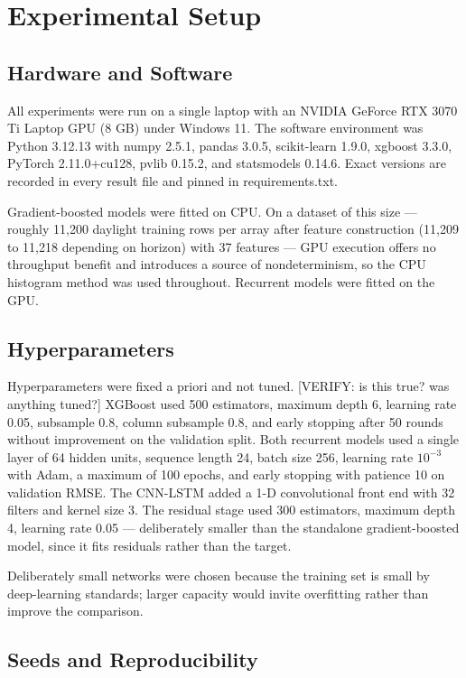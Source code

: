 \section{Experimental Setup}

\subsection{Hardware and Software}

All experiments were run on a single laptop with an NVIDIA GeForce RTX 3070 Ti Laptop GPU (8 GB) under Windows 11. The software environment was Python 3.12.13 with numpy 2.5.1, pandas 3.0.5, scikit-learn 1.9.0, xgboost 3.3.0, PyTorch 2.11.0+cu128, pvlib 0.15.2, and statsmodels 0.14.6. Exact versions are recorded in every result file and pinned in requirements.txt.

Gradient-boosted models were fitted on CPU. On a dataset of this size — roughly 11,200 daylight training rows per array after feature construction (11,209 to 11,218 depending on horizon) with 37 features — GPU execution offers no throughput benefit and introduces a source of nondeterminism, so the CPU histogram method was used throughout. Recurrent models were fitted on the GPU.

\subsection{Hyperparameters}

Hyperparameters were fixed a priori and not tuned. [VERIFY: is this true? was anything tuned?] XGBoost used 500 estimators, maximum depth 6, learning rate 0.05, subsample 0.8, column subsample 0.8, and early stopping after 50 rounds without improvement on the validation split. Both recurrent models used a single layer of 64 hidden units, sequence length 24, batch size 256, learning rate $10^{-3}$ with Adam, a maximum of 100 epochs, and early stopping with patience 10 on validation RMSE. The CNN-LSTM added a 1-D convolutional front end with 32 filters and kernel size 3. The residual stage used 300 estimators, maximum depth 4, learning rate 0.05 — deliberately smaller than the standalone gradient-boosted model, since it fits residuals rather than the target.

Deliberately small networks were chosen because the training set is small by deep-learning standards; larger capacity would invite overfitting rather than improve the comparison.

\subsection{Seeds and Reproducibility}

